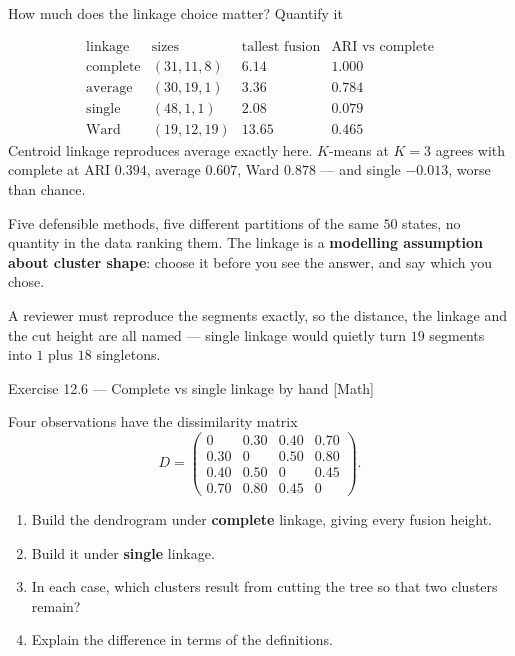 \documentclass[aspectratio=169,11pt]{beamer}
\begin{document}
\begin{frame}{How much does the linkage choice matter? Quantify it}
  \scriptsize
  \begin{numexample}[{{Standardised \texttt{USArrests}, Euclidean, cut into $K=3$}}]
    \[
      \begin{array}{l|c|c|c}
        \text{linkage} & \text{sizes} & \text{tallest fusion} & \text{ARI vs complete}\\ \hline
        \text{complete} & (31,11,8) & 6.14 & 1.000 \\
        \text{average}  & (30,19,1) & 3.36 & 0.784 \\
        \text{single}   & (48,1,1)  & 2.08 & 0.079 \\
        \text{Ward}     & (19,12,19)& 13.65& 0.465
      \end{array}
    \]
    Centroid linkage reproduces average exactly here. $K$-means at $K=3$ agrees with
    complete at ARI $0.394$, average $0.607$, Ward $0.878$ --- and single $-0.013$, worse
    than chance.
  \end{numexample}
  \begin{takeaway}
    Five defensible methods, five different partitions of the same $50$ states, no quantity
    in the data ranking them. The linkage is a \textbf{modelling assumption about cluster
    shape}: choose it before you see the answer, and say which you chose.
  \end{takeaway}
  \begin{industry}
    A reviewer must reproduce the segments exactly, so the distance, the linkage and the cut
    height are all named --- single linkage would quietly turn $19$ segments into $1$ plus
    $18$ singletons.
  \end{industry}
\end{frame}

\begin{frame}{Exercise 12.6 --- Complete vs single linkage by hand [Math]}
\begin{exercise}
  Four observations have the dissimilarity matrix
  \[
    D=\begin{pmatrix}
      0 & 0.30 & 0.40 & 0.70\\
      0.30 & 0 & 0.50 & 0.80\\
      0.40 & 0.50 & 0 & 0.45\\
      0.70 & 0.80 & 0.45 & 0
    \end{pmatrix}.
  \]
  \begin{enumerate}
    \item Build the dendrogram under \textbf{complete} linkage, giving every fusion height.
    \item Build it under \textbf{single} linkage.
    \item In each case, which clusters result from cutting the tree so that two clusters
          remain?
    \item Explain the difference in terms of the definitions.
  \end{enumerate}
\end{exercise}
\end{frame}
\end{document}
